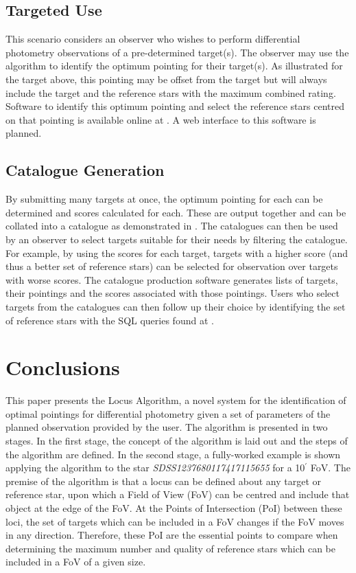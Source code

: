 \documentclass[referee]{aa}
\begin{document}
\subsection{Targeted Use}
This scenario considers an observer who wishes to perform differential photometry observations of a pre-determined target(s).  The observer may use the algorithm to identify the optimum pointing for their target(s).  As illustrated for the target above, this pointing may be offset from the target but will always include the target and the reference stars with the maximum combined rating.  Software to identify this optimum pointing and select the reference stars centred on that pointing is available online at \citet{githubrepo}.  A web interface to this software is planned. 

\subsection{Catalogue Generation}
By submitting many targets at once, the optimum pointing for each can be determined and scores calculated for each.  These are output together and can be collated into a catalogue as demonstrated in \citet{quasarpaper}. The catalogues can then be used by an observer to select targets suitable for their needs by filtering the catalogue. For example, by using the scores for each target, targets with a higher score (and thus a better set of reference stars) can be selected for observation over targets with worse scores.  The catalogue production software generates lists of targets, their pointings and the scores associated with those pointings.  Users who select targets from the catalogues can then follow up their choice by identifying the set of reference stars with the SQL queries found at \citet{githubrepo}.

\section{Conclusions}
\label{Conclusions}

This paper presents the Locus Algorithm, a novel system for the identification of optimal pointings for differential photometry given a set of parameters of the planned observation provided by the user. The algorithm is presented in two stages. In the first stage, the concept of the algorithm is laid out and the steps of the algorithm are defined. In the second stage, a fully-worked example is shown applying the algorithm to the star \textit{SDSS1237680117417115655} for a 10$^\prime$ FoV. The premise of the algorithm is that a locus can be defined about any target or reference star, upon which a Field of View (FoV) can be centred and include that object at the edge of the FoV. At the Points of Intersection (PoI) between these loci, the set of targets which can be included in a FoV changes if the FoV moves in any direction. Therefore, these PoI are the essential points to compare when
determining the maximum number and quality of reference stars which can be included in a FoV of a given size.
\end{document}

